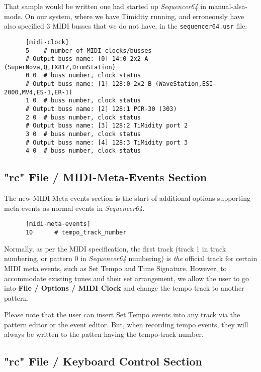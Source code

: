   That sample would be written one had started up \textsl{Sequencer64} in
   manual-alsa-mode.  On our system, where we have Timidity running, and
   erroneously have also specified 3 MIDI busses that we do not have, in the
   \texttt{sequencer64.usr} file:

   \begin{verbatim}
      [midi-clock]
      5    # number of MIDI clocks/busses
      # Output buss name: [0] 14:0 2x2 A (SuperNova,Q,TX81Z,DrumStation)
      0 0  # buss number, clock status
      # Output buss name: [1] 128:0 2x2 B (WaveStation,ESI-2000,MV4,ES-1,ER-1)
      1 0  # buss number, clock status
      # Output buss name: [2] 128:1 PCR-30 (303)
      2 0  # buss number, clock status
      # Output buss name: [3] 128:2 TiMidity port 2
      3 0  # buss number, clock status
      # Output buss name: [4] 128:3 TiMidity port 3
      4 0  # buss number, clock status
   \end{verbatim}

\subsection{"rc" File / MIDI-Meta-Events Section}
\label{subsec:seq64_rc_file_midi_meta_events}

   The new MIDI Meta events section is the start of additional options
   supporting meta events as normal events in \textsl{Sequencer64}.

   \begin{verbatim}
      [midi-meta-events]
      10      # tempo_track_number
   \end{verbatim}

   Normally, as per the MIDI specification, the first track (track 1 in track
   numbering, or pattern 0 in \textsl{Sequencer64} numbering) is \textsl{the}
   official track for certain MIDI meta events, such as Set Tempo and Time
   Signature.  However, to accommodate existing tunes and their set
   arrangement, we allow the user to go into \textbf{File / Options / MIDI
   Clock} and change the tempo track to another pattern.

   Please note that the user can insert Set Tempo events into any track via the
   pattern editor or the event editor.  But, when recording tempo events, they
   will always be written to the patten having the tempo-track number.

\subsection{"rc" File / Keyboard Control Section}
\label{subsec:seq64_rc_file_keyboard_control}
        
